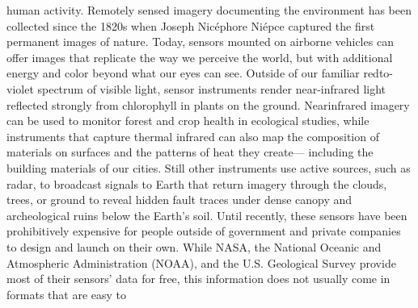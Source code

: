 \begin{itemize}
human activity.
Remotely sensed imagery documenting the environment has been collected
since the 1820s when Joseph Nicéphore Niépce captured the first permanent
images of nature. Today, sensors mounted on airborne vehicles can
offer images that replicate the way we perceive the world, but with additional
energy and color beyond what our eyes can see. Outside of our familiar redto-
violet spectrum of visible light, sensor instruments render near-infrared
light reflected strongly from chlorophyll in plants on the ground. Nearinfrared
imagery can be used to monitor forest and crop health in ecological
studies, while instruments that capture thermal infrared can also map
the composition of materials on surfaces and the patterns of heat they create—
including the building materials of our cities. Still other instruments
use active sources, such as radar, to broadcast signals to Earth that return
imagery through the clouds, trees, or ground to reveal hidden fault traces
under dense canopy and archeological ruins below the Earth's soil.
Until recently, these sensors have been prohibitively expensive for people
outside of government and private companies to design and launch on their
own. While NASA, the National Oceanic and Atmospheric Administration
(NOAA), and the U.S. Geological Survey provide most of their sensors' data
for free, this information does not usually come in formats that are easy to


\end{itemize}
